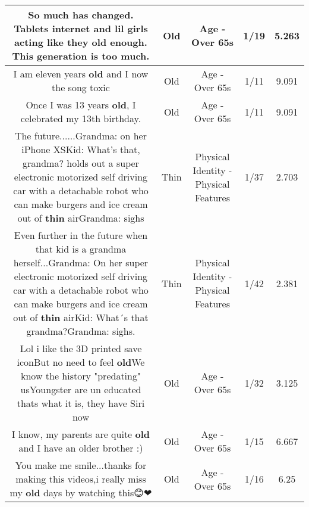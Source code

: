 \documentclass[11pt]{article}
\newlength\mylength
\begin{document}
\begin{center}
\begin{longtable}{|C{.65\mylength}|C{.30\mylength}|C{.12\mylength}|C{.12\mylength}|C{.12\mylength}|}
  \small So much has changed. Tablets internet and lil girls acting like they \textbf{old} enough. This generation is too much.\normalsize   & Old & Age - Over 65s & 1/19 & 5.263 \\  \hline
  \small I am eleven years \textbf{old} and I now the song toxic\normalsize   & Old & Age - Over 65s & 1/11 & 9.091 \\  \hline
  \small Once I was 13 years \textbf{old}, I celebrated my 13th birthday.\normalsize   & Old & Age - Over 65s & 1/11 & 9.091 \\  \hline
  \small The future......Grandma: on her iPhone XSKid: What's that, grandma? holds out a super electronic motorized self driving car with a detachable robot who can make burgers and ice cream out of \textbf{thin} airGrandma: sighs\normalsize   & Thin & Physical Identity - Physical Features & 1/37 & 2.703 \\  \hline
  \small Even further in the future when that kid is a grandma herself...Grandma: On her super electronic motorized self driving car with a detachable robot who can make burgers and ice cream out of \textbf{thin} airKid: What´s that grandma?Grandma: sighs.\normalsize   & Thin & Physical Identity - Physical Features & 1/42 & 2.381 \\  \hline
  \small Lol i like the 3D printed save iconBut no need to feel \textbf{old}We know the history "predating" usYoungster are un educated thats what it is, they have Siri now\normalsize   & Old & Age - Over 65s & 1/32 & 3.125 \\  \hline
  \small {} I know, my parents are quite \textbf{old} and I have an older brother :)\normalsize   & Old & Age - Over 65s & 1/15 & 6.667 \\  \hline
  \small You make me smile...thanks for making this videos,i really miss my \textbf{old} days by watching this😊❤\normalsize   & Old & Age - Over 65s & 1/16 & 6.25 \\  \hline

\end{longtable}
\end{center}
\end{document}
